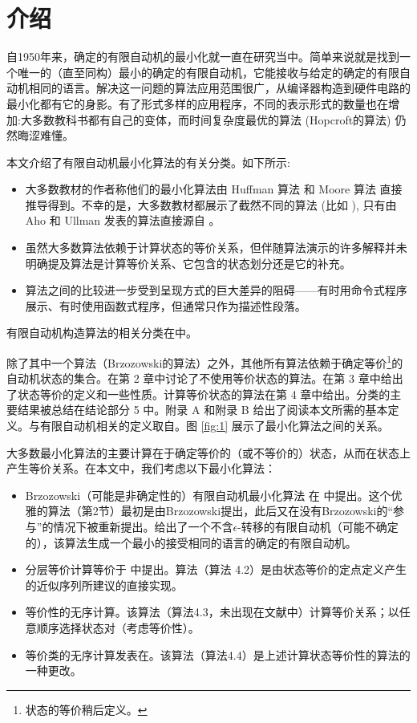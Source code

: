 

\chapter{介绍}

自1950年来，确定的有限自动机的最小化就一直在研究当中。简单来说就是找到一个唯一的（直至同构）最小的确定的有限自动机，它能接收与给定的确定的有限自动机相同的语言。解决这一问题的算法应用范围很广，从编译器构造到硬件电路的最小化都有它的身影。有了形式多样的应用程序，不同的表示形式的数量也在增加:大多数教科书都有自己的变体，而时间复杂度最优的算法 (Hopcroft的算法) 仍然晦涩难懂。

本文介绍了有限自动机最小化算法的有关分类。如下所示:

\begin{itemize}
    \item 大多数教材的作者称他们的最小化算法由 Huffman 算法 \cite{Huff54} 和 Moore 算法 \cite{Moor56} 直接推导得到。不幸的是，大多数教材都展示了截然不同的算法 (比如 \cite{AU92,ASU86,Hu79,Wood87}), 只有由 Aho 和 Ullman 发表的算法直接源自 \cite{Huff54, Moor56}。
    \item 虽然大多数算法依赖于计算状态的等价关系，但伴随算法演示的许多解释并未明确提及算法是计算等价关系、它包含的状态划分还是它的补充。
    \item 算法之间的比较进一步受到呈现方式的巨大差异的阻碍——有时用命令式程序展示、有时使用函数式程序，但通常只作为描述性段落。
\end{itemize}

有限自动机构造算法的相关分类在\cite{Wats93}中。

除了其中一个算法（Brzozowski的算法）之外，其他所有算法依赖于确定等价\footnote{状态的等价稍后定义。}的自动机状态的集合。在第 2 章中讨论了不使用等价状态的算法。在第 3 章中给出了状态等价的定义和一些性质。计算等价状态的算法在第 4 章中给出。分类的主要结果被总结在结论部分 5 中。附录 A 和附录 B 给出了阅读本文所需的基本定义。与有限自动机相关的定义取自\cite{Wats93}。图 \ref{fig:1} 展示了最小化算法之间的关系。

大多数最小化算法的主要计算在于确定等价的（或不等价的）状态，从而在状态上产生等价关系。在本文中，我们考虑以下最小化算法：
\begin{itemize}
    \item Brzozowski（可能是非确定性的）有限自动机最小化算法 在 \cite{Brzo62} 中提出。这个优雅的算法（第2节）最初是由Brzozowski提出，此后又在没有Brzozowski的“参与”的情况下被重新提出。给出了一个不含$\epsilon$-转移的有限自动机（可能不确定的），该算法生成一个最小的接受相同的语言的确定的有限自动机。

    \item 分层等价计算等价于 \cite{Wood87, Moor56, Brau88, Urba89} 中提出。算法（算法 4.2）是由状态等价的定点定义产生的近似序列所建议的直接实现。

    \item 等价性的无序计算。该算法（算法4.3，未出现在文献中）计算等价关系；以任意顺序选择状态对（考虑等价性）。

    \item 等价类的无序计算发表在\cite{ASU86}。该算法（算法4.4）是上述计算状态等价性的算法的一种更改。

\end{itemize}

